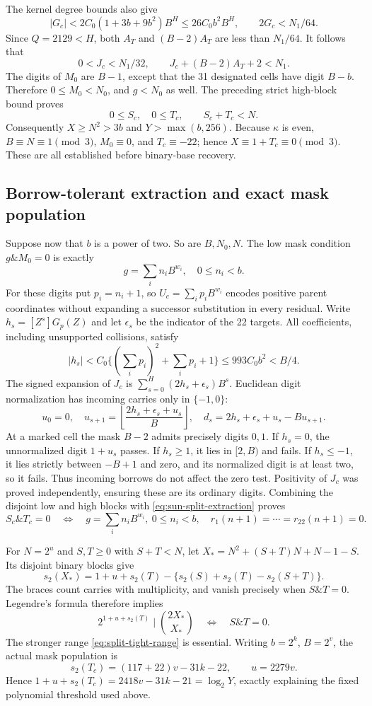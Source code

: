 The kernel degree bounds also give
\[
 |G_c|<2C_0(1+3b+9b^2)B^H\le26C_0b^2B^H,\qquad
 2G_c<N_1/64.
\]
Since $Q=2129<H$, both $A_T$ and $(B-2)A_T$ are less than $N_1/64$.
It follows that
\[
 0<J_c<N_1/32,\qquad J_c+(B-2)A_T+2<N_1.
\]
The digits of $M_0$ are $B-1$, except that the 31 designated cells
have digit $B-b$. Therefore $0\le M_0<N_0$, and $g<N_0$ as well.
The preceding strict high-block bound proves
\begin{equation}\label{eq:split-tight-range}
 0\le S_c,\quad0\le T_c,\qquad S_c+T_c<N.
\end{equation}
Consequently $X\ge N^2>3b$ and $Y>\max(b,256)$. Because $\kappa$ is
even, $B\equiv N\equiv1\pmod3$, $M_0\equiv0$, and
$T_c\equiv-22$; hence $X\equiv1+T_c\equiv0\pmod3$.
These are all established before binary-base recovery.

\subsection{Borrow-tolerant extraction and exact mask population}

Suppose now that $b$ is a power of two. So are $B,N_0,N$. The low
mask condition $g\mathbin{\&}M_0=0$ is exactly
\[
 g=\sum_i n_iB^{w_i},\quad0\le n_i<b.
\]
For these digits put $p_i=n_i+1$, so $U_c=\sum_i p_iB^{w_i}$ encodes
positive parent coordinates without expanding a successor substitution
in every residual. Write $h_s=[Z^s]G_p(Z)$ and let $\epsilon_s$ be the
indicator of the 22 targets. All coefficients, including unsupported
collisions, satisfy
\[
 |h_s|<C_0\{(\sum_i p_i)^2+\sum_i p_i+1\}
 \le993C_0b^2<B/4.
\]
The signed expansion of $J_c$ is $\sum_{s=0}^{H}(2h_s+\epsilon_s)B^s$.
Euclidean digit normalization has incoming carries only in $\{-1,0\}$:
\[
 u_0=0,\quad u_{s+1}=\left\lfloor\frac{2h_s+\epsilon_s+u_s}{B}\right\rfloor,
 \quad d_s=2h_s+\epsilon_s+u_s-Bu_{s+1}.
\]
At a marked cell the mask $B-2$ admits precisely digits $0,1$.
If $h_s=0$, the unnormalized digit $1+u_s$ passes. If $h_s\ge1$,
it lies in $[2,B)$ and fails. If $h_s\le-1$, it lies strictly between
$-B+1$ and zero, and its normalized digit is at least two, so it fails.
Thus incoming borrows do not affect the zero test. Positivity of $J_c$
was proved independently, ensuring these are its ordinary digits.
Combining the disjoint low and high blocks with
\eqref{eq:sun-split-extraction} proves
\[
 S_c\mathbin{\&}T_c=0
 \quad\Longleftrightarrow\quad
 g=\sum_i n_iB^{w_i},\ 0\le n_i<b,\quad r_1(n+1)=\cdots=r_{22}(n+1)=0.
\]

For $N=2^u$ and $S,T\ge0$ with $S+T<N$, let
$X_*=N^2+(S+T)N+N-1-S$. Its disjoint binary blocks give
\[
 s_2(X_*)=1+u+s_2(T)-\{s_2(S)+s_2(T)-s_2(S+T)\}.
\]
The braces count carries with multiplicity, and vanish precisely when
$S\mathbin{\&}T=0$. Legendre's formula therefore implies
\[
 2^{1+u+s_2(T)}\mid\binom{2X_*}{X_*}
 \quad\Longleftrightarrow\quad S\mathbin{\&}T=0.
\]
The stronger range \eqref{eq:split-tight-range} is essential.
Writing $b=2^k$, $B=2^v$, the actual mask population is
\[
 s_2(T_c)=(117+22)v-31k-22,\qquad u=2279v.
\]
Hence $1+u+s_2(T_c)=2418v-31k-21=\log_2Y$, exactly explaining the
fixed polynomial threshold used above.

